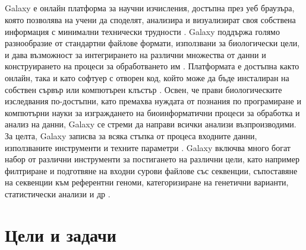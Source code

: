 \documentclass[pdftex,cyrillic,14pt,a4page,twoside,openright]{extreport}
\begin{document}
\paragraph{}
Galaxy е онлайн платформа за научни изчисления, достъпна през уеб браузъра, която позволява на учени да споделят, анализира и визуализират своя собствена информация с минимални технически трудности \cite{galaxy2022}. Galaxy поддържа голямо разнообразие от стандартни файлове формати, използвани за биологически цели, и дава възможност за интегрирането на различни множества от данни и конструирането на процеси за обработването им \cite{blankenberg2011}. Платформата е достъпна както онлайн, така и като софтуер с отворен код, който може да бъде инсталиран на собствен сървър или компютърен клъстър \cite{nekrutenko2010}. Освен, че прави биологическите изследвания по-достъпни, като премахва нуждата от познания по програмиране и компютърни науки за изграждането на биоинформатични процеси за обработка и анализ на данни, Galaxy се стреми да направи всички анализи възпроизводими. За целта, Galaxy записва за всяка стъпка от процеса входните данни, използваните инструменти и техните параметри \cite{schatz2010}. Galaxy включва много богат набор от различни инструменти за постигането на различни цели, като например филтриране и подготвяне на входни сурови файлове със секвенции, съпоставяне на секвенции към референтни геноми, категоризиране на генетични варианти, статистически анализи и др \cite{schatz2010}.

\chapter{Цели и задачи}
\end{document}
